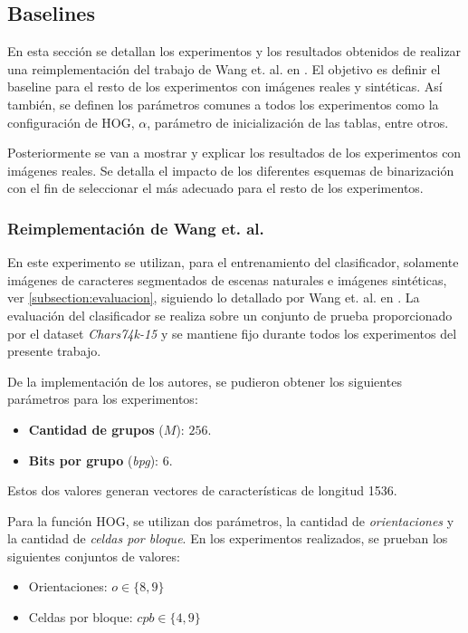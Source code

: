 \subsection{Baselines}
\label{subsection:baseline}

	En esta sección se detallan los experimentos y los resultados obtenidos de realizar una reimplementación del trabajo de Wang et. al. en \cite{wang}. El objetivo es definir el baseline para el resto de los experimentos con imágenes reales y sintéticas. Así también, se definen los parámetros comunes a todos los experimentos como la configuración de HOG, $\alpha$, parámetro de i\-ni\-cia\-li\-za\-ción de las tablas, entre otros.
	
	Posteriormente se van a mostrar y explicar los resultados de los experimentos con imágenes reales. Se detalla el impacto de los diferentes esquemas de binarización con el fin de seleccionar el más adecuado para el resto de los experimentos.
	
	
\subsubsection{Reimplementación de Wang et. al.}

	En este experimento se utilizan, para el entrenamiento del clasificador, solamente imágenes de caracteres segmentados de escenas naturales e i\-má\-ge\-nes sintéticas, ver \ref{subsection:evaluacion}, siguiendo lo detallado por Wang et. al. en \cite{wang}. La e\-va\-lua\-ción del clasificador se realiza sobre un conjunto de prueba proporcionado por el dataset \textit{Chars74k-15} y se mantiene fijo durante todos los experimentos del presente trabajo.
	
	De la implementación de los autores, se pudieron obtener los siguientes parámetros para los experimentos:
	\begin{itemize}
		\item \textbf{Cantidad de grupos} ($M$): $256$.
		\item \textbf{Bits por grupo} (\textit{bpg}): $6$.
	\end{itemize}
	
	Estos dos valores generan vectores de características de longitud 1536.
	
	Para la función HOG,	 se utilizan dos parámetros, la cantidad de \textit{o\-rien\-ta\-cio\-nes} y la cantidad de \textit{celdas por bloque}. En los experimentos realizados, se prueban los siguientes conjuntos de valores:
	
	\begin{itemize}
		\item Orientaciones: $\textit{o} \in \{8, 9\}$
		\item Celdas por bloque: $\textit{cpb} \in \{4, 9\}$
	\end{itemize}
	
